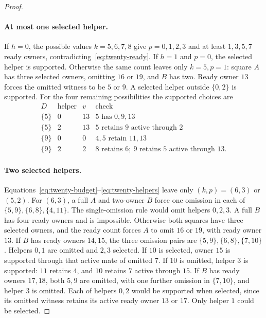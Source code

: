 \begin{proof}
\paragraph{At most one selected helper.}
If $h=0$, the possible values $k=5,6,7,8$ give $p=0,1,2,3$ and at least
$1,3,5,7$ ready owners, contradicting~\eqref{eq:twenty-ready}.
If $h=1$ and $p=0$, the selected helper is supported. Otherwise the same
count leaves only $k=5,p=1$: square $A$ has three selected owners, omitting
$16$ or $19$, and $B$ has two. Ready owner $13$ forces the omitted witness
to be $5$ or $9$. A selected helper outside $\{0,2\}$ is supported.
For the four remaining possibilities the supported choices are
\[
\begin{array}{c|c|c|l}
D&\text{helper}&v&\text{check}\\\hline
\{5\}&0&13&5\text{ has }0,9,13\\
\{5\}&2&13&5\text{ retains }9\text{ active through }2\\
\{9\}&0&0&4,5\text{ retain }11,13\\
\{9\}&2&2&8\text{ retains }6;\ 9\text{ retains }5\text{ active through }13.
\end{array}
\]

\paragraph{Two selected helpers.}
Equations~\eqref{eq:twenty-budget}--\eqref{eq:twenty-helpers} leave only
$(k,p)=(6,3)$ or $(5,2)$. For $(6,3)$, a full $A$ and two-owner $B$ force
one omission in each of $\{5,9\},\{6,8\},\{4,11\}$.
The single-omission rule would omit helpers $0,2,3$. A full $B$ has four
ready owners and is impossible. Otherwise both squares have three selected
owners, and the ready count forces $A$ to omit $16$ or $19$, with ready
owner $13$. If $B$ has ready owners $14,15$, the three omission pairs are
$\{5,9\},\{6,8\},\{7,10\}$. Helpers $0,1$ are omitted and $2,3$
selected. If $10$ is selected, owner $15$ is supported through that active
mate of omitted $7$. If $10$ is omitted, helper $3$ is supported: $11$
retains $4$, and $10$ retains $7$ active through $15$.
If $B$ has ready owners $17,18$, both $5,9$ are omitted, with one further
omission in $\{7,10\}$, and helper $3$ is omitted. Each of helpers $0,2$
would be supported when selected, since its omitted witness retains its
active ready owner $13$ or $17$. Only helper $1$ could be selected.


\end{proof}
